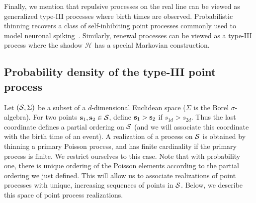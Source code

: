 \documentclass{statsoc}
\begin{document}
Finally, we mention that repulsive processes on the real line can be viewed as generalized \matern type-III processes where birth times are
observed. Probabilistic thinning recovers a class of self-inhibiting point processes commonly used to model neuronal spiking~\citep{Brown2004a}. Similarly, renewal processes
can be viewed as a \matern type-III process where the shadow $\mathscr{H}$ has a special Markovian construction. %


\subsection{Probability density of the \matern type-III point process}  \label{sec:matern_pdf}

%
Let $({\mathcal S}, \Sigma)$ be a subset of a $d$-dimensional Euclidean space ($\Sigma$ is the Borel $\sigma$-algebra). For two points $\mathbf{s}_1, \mathbf{s}_2 \in {\mathcal S}$,
define ${\mathbf{s}_1 > \mathbf{s}_2}$ if ${s_{1d} > s_{2d}}$. Thus the last coordinate defines a partial ordering on ${\mathcal S}$ (and we will associate this 
coordinate with the birth time of an event).
A realization %
of a \matern process on ${\mathcal S}$  is obtained by thinning a primary Poisson process, and has finite cardinality if the primary process is finite. 
We restrict ourselves to this case. Note that with probability one, there is unique ordering of the Poisson elements
according to the partial ordering we just defined. This will allow us to associate realizations of point processes
with unique, increasing sequences of points in ${\mathcal S}$. Below, we describe this space of point process realizations.
\end{document}
